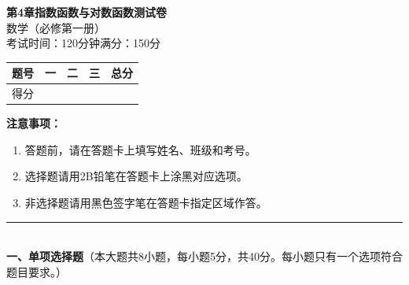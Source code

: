 \documentclass[12pt, a4paper]{ctexart}
\begin{document}
\begin{center}
{\Large\bfseries 第4章\quad 指数函数与对数函数\quad 测试卷}\\[6pt]
{\normalsize 数学（必修第一册）}\\[4pt]
{\small 考试时间：120分钟\quad 满分：150分}
\end{center}

\vspace{2pt}
\begin{center}
\begin{tabular}{|c|c|c|c|c|}
\hline
题号 & 一 & 二 & 三 & 总分 \\ \hline
得分 & & & & \\ \hline
\end{tabular}
\end{center}
\vspace{4pt}

\noindent\textbf{注意事项：}
\begin{enumerate}[leftmargin=2em]
  \item 答题前，请在答题卡上填写姓名、班级和考号。
  \item 选择题请用2B铅笔在答题卡上涂黑对应选项。
  \item 非选择题请用黑色签字笔在答题卡指定区域作答。
\end{enumerate}

\vspace{6pt}

\noindent\rule{\textwidth}{0.4pt}\\[2pt]
{\large\bfseries 一、单项选择题}（本大题共8小题，每小题5分，共40分。每小题只有一个选项符合题目要求。）

\vspace{6pt}
\end{document}
